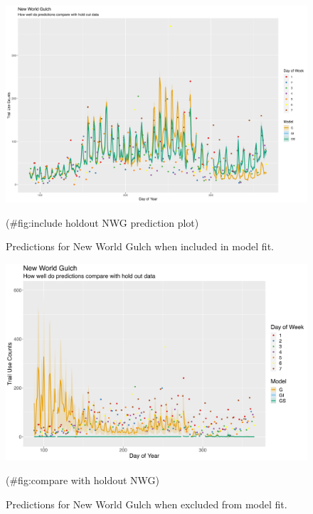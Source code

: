 \documentclass[
]{book}
\begin{document}
\begin{figure}

{\centering \includegraphics[width=1\linewidth]{../figures/NWG_insample_pred_compare} 

}

\caption{Predictions for New World Gulch when included in model fit.}(\#fig:include holdout NWG prediction plot)
\end{figure}

\begin{figure}

{\centering \includegraphics[width=1\linewidth]{../figures/NWG_pred_compare} 

}

\caption{Predictions for New World Gulch when excluded from model fit.}(\#fig:compare with holdout NWG)
\end{figure}

  
\end{document}

